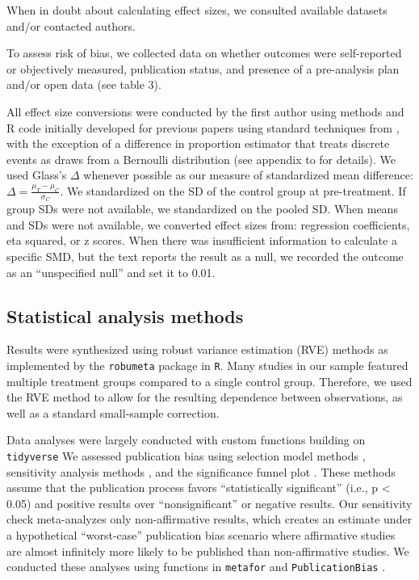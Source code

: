 \documentclass[sn-nature,referee,pdflatex]{sn-jnl}
\begin{document}
When in doubt about calculating effect sizes, we consulted available
datasets and/or contacted authors.

To assess risk of bias, we collected data on whether outcomes were
self-reported or objectively measured, publication status, and presence
of a pre-analysis plan and/or open data (see table 3).

All effect size conversions were conducted by the first author using
methods and R code initially developed for previous papers
\citep{paluck2019, paluck2021, porat2024} using standard techniques from
\citep{cooper2019}, with the exception of a difference in proportion
estimator that treats discrete events as draws from a Bernoulli
distribution (see appendix to \citep{paluck2021} for details). We used
Glass's \(\Delta\) whenever possible as our measure of standardized mean
difference: \(\Delta = \frac{\mu_T - \mu_C}{\sigma_C}\). We standardized
on the SD of the control group at pre-treatment. If group SDs were not
available, we standardized on the pooled SD. When means and SDs were not
available, we converted effect sizes from: regression coefficients, eta
squared, or z scores. When there was insufficient information to
calculate a specific SMD, but the text reports the result as a null, we
recorded the outcome as an ``unspecified null'' and set it to 0.01.

\subsection{Statistical analysis methods}\label{sec3.4}

Results were synthesized using robust variance estimation (RVE) methods
\citep{hedges2010} as implemented by the \texttt{robumeta} package
\citep{fisher2015} in \texttt{R}\citep{Rlang}. Many studies in our
sample featured multiple treatment groups compared to a single control
group. Therefore, we used the RVE method to allow for the resulting
dependence between observations, as well as a standard small-sample
correction.

Data analyses were largely conducted with custom functions building on
\texttt{tidyverse} \citep{wickham2019} We assessed publication bias
using selection model methods \citep{hedges1992, vevea1995}, sensitivity
analysis methods \citep{mathur2024}, and the significance funnel plot
\citep{mathur2020}. These methods assume that the publication process
favors ``statistically significant'' (i.e., p \textless{} 0.05) and
positive results over ``nonsignificant'' or negative results. Our
sensitivity check meta-analyzes only non-affirmative results, which
creates an estimate under a hypothetical ``worst-case'' publication bias
scenario where affirmative studies are almost infinitely more likely to
be published than non-affirmative studies. We conducted these analyses
using functions in \texttt{metafor} \citep{viechtbauer2010} and
\texttt{PublicationBias} \citep{mathur2020, mathur2024}.
\end{document}
